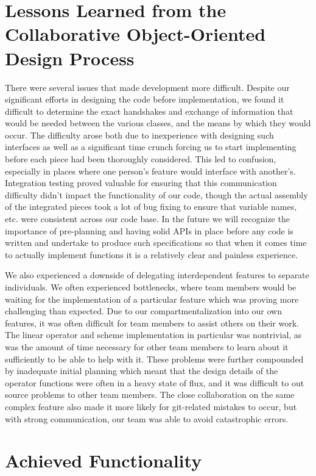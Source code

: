 \documentclass{article}
\begin{document}
	\section{Lessons Learned from the Collaborative Object-Oriented Design Process}
	
	There were several issues that made development more difficult. Despite our significant efforts in designing the code before implementation, we found it difficult to determine the exact handshakes and exchange of information that would be needed between the various classes, and the means by which they would occur. The difficulty arose both due to inexperience with designing such interfaces as well as a significant time crunch forcing us to start implementing before each piece had been thoroughly considered. This led to confusion, especially in places where one person’s feature would interface with another’s. Integration testing proved valuable for ensuring that this communication difficulty didn’t impact the functionality of our code, though the actual assembly of the integrated pieces took a lot of bug fixing to ensure that variable names, etc. were consistent across our code base. In the future we will recognize the importance of pre-planning and having solid APIs in place before any code is written and undertake to produce such specifications so that when it comes time to actually implement functions it is a relatively clear and painless experience.
	
	We also experienced a downside of delegating interdependent features to separate individuals. We often experienced bottlenecks, where team members would be waiting for the implementation of a particular feature which was proving more challenging than expected. Due to our compartmentalization into our own features, it was often difficult for team members to assist others on their work. The linear operator and scheme implementation in particular was nontrivial, as was the amount of time necessary for other team members to learn about it sufficiently to be able to help with it. These problems were further compounded by inadequate initial planning which meant that the design details of the operator functions were often in a heavy state of flux, and it was difficult to out source problems to other team members. The close collaboration on the same complex feature also made it more likely for git-related mistakes to occur, but with strong communication, our team was able to avoid catastrophic errors. 

	\section{Achieved Functionality}
\end{document}
